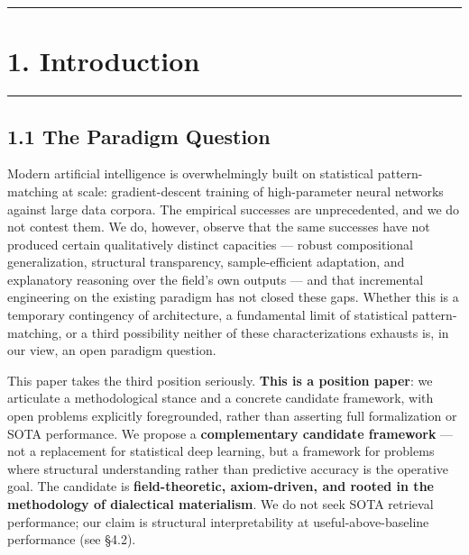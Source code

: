 \documentclass[
]{article}
\begin{document}
\begin{center}\rule{0.5\linewidth}{0.5pt}\end{center}

\hypertarget{introduction}{%
\section{1. Introduction}\label{introduction}}

\begin{center}\rule{0.5\linewidth}{0.5pt}\end{center}

\hypertarget{the-paradigm-question}{%
\subsection{1.1 The Paradigm Question}\label{the-paradigm-question}}

Modern artificial intelligence is overwhelmingly built on statistical
pattern-matching at scale: gradient-descent training of high-parameter
neural networks against large data corpora. The empirical successes are
unprecedented, and we do not contest them. We do, however, observe that
the same successes have not produced certain qualitatively distinct
capacities --- robust compositional generalization, structural
transparency, sample-efficient adaptation, and explanatory reasoning
over the field's own outputs --- and that incremental engineering on the
existing paradigm has not closed these gaps. Whether this is a temporary
contingency of architecture, a fundamental limit of statistical
pattern-matching, or a third possibility neither of these
characterizations exhausts is, in our view, an open paradigm question.

This paper takes the third position seriously. \textbf{This is a
position paper}: we articulate a methodological stance and a concrete
candidate framework, with open problems explicitly foregrounded, rather
than asserting full formalization or SOTA performance. We propose a
\textbf{complementary candidate framework} --- not a replacement for
statistical deep learning, but a framework for problems where structural
understanding rather than predictive accuracy is the operative goal. The
candidate is \textbf{field-theoretic, axiom-driven, and rooted in the
methodology of dialectical materialism}. We do not seek SOTA retrieval
performance; our claim is structural interpretability at
useful-above-baseline performance (see §4.2).
\end{document}
